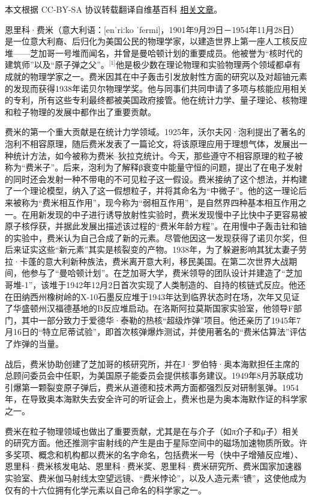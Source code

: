 
本文根据 CC-BY-SA 协议转载翻译自维基百科 \href{https://en.wikipedia.org/wiki/Enrico_Fermi}{相关文章}。

恩里科·费米（意大利语：[enˈriːko ˈfermi]，1901年9月29日－1954年11月28日）是一位意大利裔、后归化为美国公民的物理学家，以建造世界上第一座人工核反应堆——芝加哥一号堆而闻名，并曾是曼哈顿计划的重要成员。他被誉为“核时代的建筑师”以及“原子弹之父”。\(^\text{[1]}\)他是极少数在理论物理和实验物理两个领域都卓有成就的物理学家之一。费米因其在中子轰击引发放射性方面的研究以及对超铀元素的发现而获得1938年诺贝尔物理学奖。他与同事们共同申请了多项与核能应用相关的专利，所有这些专利最终都被美国政府接管。他在统计力学、量子理论、核物理和粒子物理的发展中都作出了重要贡献。

费米的第一个重大贡献是在统计力学领域。1925年，沃尔夫冈·泡利提出了著名的泡利不相容原理，随后费米发表了一篇论文，将该原理应用于理想气体，发展出一种统计方法，如今被称为费米–狄拉克统计。今天，那些遵守不相容原理的粒子被称为“费米子”。后来，泡利为了解释β衰变中能量守恒的问题，提出了在电子发射的同时还会发射一种不带电的不可见粒子这一假设。费米接纳了这个想法，并构建了一个理论模型，纳入了这一假想粒子，并将其命名为“中微子”。他的这一理论后来被称为“费米相互作用”，现今称为“弱相互作用”，是自然界四种基本相互作用之一。在用新发现的中子进行诱导放射性实验时，费米发现慢中子比快中子更容易被原子核俘获，并据此发展出描述该过程的“费米年龄方程”。在用慢中子轰击钍和铀的实验中，费米认为自己合成了新的元素。尽管他因这一发现获得了诺贝尔奖，但后来证实这些“新元素”其实是核裂变的产物。1938年，为了躲避影响其犹太妻子劳拉·卡蓬的意大利新种族法，费米离开意大利，移民美国。在第二次世界大战期间，他参与了“曼哈顿计划”。在芝加哥大学，费米领导的团队设计并建造了“芝加哥堆-1”，该堆于1942年12月2日首次实现了人类制造的、自持的核链式反应。他还在田纳西州橡树岭的X-10石墨反应堆于1943年达到临界状态时在场，次年又见证了华盛顿州汉福德基地的B反应堆启动。在洛斯阿拉莫斯国家实验室，他领导F部门，其中一部分致力于爱德华·泰勒的热核“超级炸弹”项目。他还亲历了1945年7月16日的“特立尼蒂试验”，即首次核弹爆炸测试，并使用著名的“费米估算法”评估了炸弹的当量。

战后，费米协助创建了芝加哥的核研究所，并在J·罗伯特·奥本海默担任主席的总顾问委员会中任职，为美国原子能委员会提供核事务建议。1949年8月苏联成功引爆第一颗裂变原子弹后，费米从道德和技术两方面都强烈反对研制氢弹。1954年，在导致奥本海默失去安全许可的听证会上，费米也是为奥本海默作证的科学家之一。

费米在粒子物理领域也做出了重要贡献，尤其是在与介子（如π介子和μ子）相关的研究方面。他还推测宇宙射线的产生是由于星际空间中的磁场加速物质所致。许多奖项、概念和机构都以费米的名字命名，包括费米一号（快中子增殖反应堆）、恩里科·费米核发电站、恩里科·费米奖、恩里科·费米研究所、费米国家加速器实验室、费米伽马射线太空望远镜、“费米悖论”，以及人造元素“镄”，这使他成为仅有的十六位拥有化学元素以自己命名的科学家之一。
